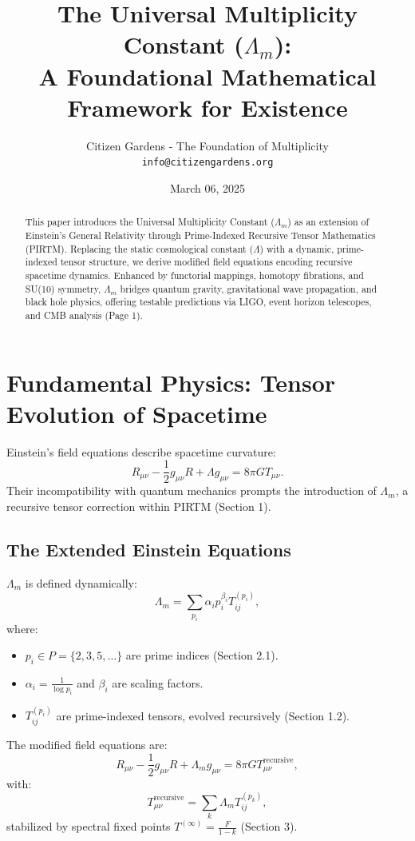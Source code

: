 \documentclass{article}
\title{\textbf{The Universal Multiplicity Constant ($\Lambda_m$)}: \\ A Foundational Mathematical Framework for Existence}
\author{Citizen Gardens - The Foundation of Multiplicity \\ \texttt{info@citizengardens.org}}
\date{March 06, 2025}
\theoremstyle{plain}
\begin{document}
\maketitle

\begin{abstract}
This paper introduces the Universal Multiplicity Constant (\(\Lambda_m\)) as an extension of Einstein’s General Relativity through Prime-Indexed Recursive Tensor Mathematics (PIRTM). Replacing the static cosmological constant (\(\Lambda\)) with a dynamic, prime-indexed tensor structure, we derive modified field equations encoding recursive spacetime dynamics. Enhanced by functorial mappings, homotopy fibrations, and SU(10) symmetry, \(\Lambda_m\) bridges quantum gravity, gravitational wave propagation, and black hole physics, offering testable predictions via LIGO, event horizon telescopes, and CMB analysis (Page 1).
\end{abstract}

\section{Fundamental Physics: Tensor Evolution of Spacetime}
Einstein’s field equations describe spacetime curvature:
\begin{equation}
R_{\mu\nu} - \frac{1}{2} g_{\mu\nu} R + \Lambda g_{\mu\nu} = 8\pi G T_{\mu\nu}.
\end{equation}
Their incompatibility with quantum mechanics prompts the introduction of \(\Lambda_m\), a recursive tensor correction within PIRTM (Section 1).

\subsection{The Extended Einstein Equations}
\(\Lambda_m\) is defined dynamically:
\begin{equation}
\Lambda_m = \sum_{p_i} \alpha_i p_i^{\beta_i} T_{ij}^{(p_i)},
\end{equation}
where:
\begin{itemize}
    \item \( p_i \in P = \{2, 3, 5, \dots\} \) are prime indices (Section 2.1).
    \item \( \alpha_i = \frac{1}{\log p_i} \) and \( \beta_i \) are scaling factors.
    \item \( T_{ij}^{(p_i)} \) are prime-indexed tensors, evolved recursively (Section 1.2).
\end{itemize}
The modified field equations are:
\begin{equation}
R_{\mu\nu} - \frac{1}{2} g_{\mu\nu} R + \Lambda_m g_{\mu\nu} = 8\pi G T_{\mu\nu}^{\text{recursive}},
\end{equation}
with:
\begin{equation}
T_{\mu\nu}^{\text{recursive}} = \sum_{k} \Lambda_m T_{ij}^{(p_k)},
\end{equation}
stabilized by spectral fixed points \( T^{(\infty)} = \frac{F}{1 - k} \) (Section 3).
\end{document}

